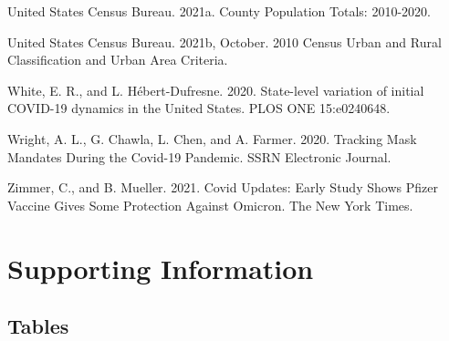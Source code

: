 \documentclass[
  12pt,
]{article}
\newlength{\cslhangindent}
\newlength{\cslentryspacingunit} %
\newenvironment{CSLReferences}[2] %
 {%
  \setlength{\parindent}{0pt}
  \ifodd #1
  \let\oldpar\par
  \def\par{\hangindent=\cslhangindent\oldpar}
  \fi
  \setlength{\parskip}{#2\cslentryspacingunit}
 }%
 {}
\begin{document}
\begin{CSLReferences}{1}{0}
\leavevmode{}%
United States Census Bureau. 2021a. County {Population} {Totals}: 2010-2020.

\leavevmode{}%
United States Census Bureau. 2021b, October. 2010 {Census} {Urban} and {Rural} {Classification} and {Urban} {Area} {Criteria}.

\leavevmode{}%
White, E. R., and L. Hébert-Dufresne. 2020. State-level variation of initial {COVID}-19 dynamics in the {United} {States}. PLOS ONE 15:e0240648.

\leavevmode{}%
Wright, A. L., G. Chawla, L. Chen, and A. Farmer. 2020. Tracking {Mask} {Mandates} {During} the {Covid}-19 {Pandemic}. SSRN Electronic Journal.

\leavevmode{}%
Zimmer, C., and B. Mueller. 2021. Covid {Updates}: {Early} {Study} {Shows} {Pfizer} {Vaccine} {Gives} {Some} {Protection} {Against} {Omicron}. The New York Times.

\end{CSLReferences}

\clearpage

\setcounter{page}{0}
\setcounter{page}{1}

\setcounter{figure}{0}
\setcounter{table}{0}
\renewcommand {\thetable}{S\arabic{table}}
\renewcommand {\thefigure}{S\arabic{figure}}

\hypertarget{supporting-information}{%
\section{Supporting Information}\label{supporting-information}}

\hypertarget{tables}{%
\subsection{Tables}\label{tables}}
\end{document}
